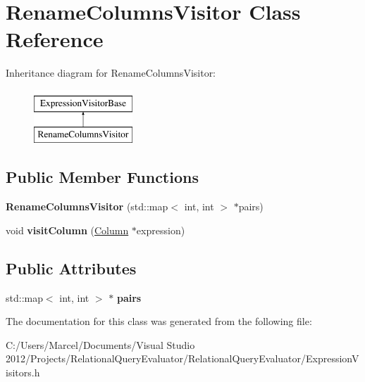 \hypertarget{class_rename_columns_visitor}{\section{Rename\+Columns\+Visitor Class Reference}
\label{class_rename_columns_visitor}
}
Inheritance diagram for Rename\+Columns\+Visitor\+:\begin{figure}[H]
\begin{center}
\leavevmode
\includegraphics[height=2.000000cm]{class_rename_columns_visitor}
\end{center}
\end{figure}
\subsection*{Public Member Functions}
\begin{DoxyCompactItemize}
\item 
\hypertarget{class_rename_columns_visitor_a119cb79b414164ac4bb2adcfaf6bdcf9}{{\bfseries Rename\+Columns\+Visitor} (std\+::map$<$ int, int $>$ $\ast$pairs)}\label{class_rename_columns_visitor_a119cb79b414164ac4bb2adcfaf6bdcf9}

\item 
\hypertarget{class_rename_columns_visitor_a45835dde3fa3190a803493a0e3f1e75a}{void {\bfseries visit\+Column} (\hyperlink{class_column}{Column} $\ast$expression)}\label{class_rename_columns_visitor_a45835dde3fa3190a803493a0e3f1e75a}

\end{DoxyCompactItemize}
\subsection*{Public Attributes}
\begin{DoxyCompactItemize}
\item 
\hypertarget{class_rename_columns_visitor_a40542b4f59af34a28e298d719ca426c1}{std\+::map$<$ int, int $>$ $\ast$ {\bfseries pairs}}\label{class_rename_columns_visitor_a40542b4f59af34a28e298d719ca426c1}

\end{DoxyCompactItemize}


The documentation for this class was generated from the following file\+:\begin{DoxyCompactItemize}
\item 
C\+:/\+Users/\+Marcel/\+Documents/\+Visual Studio 2012/\+Projects/\+Relational\+Query\+Evaluator/\+Relational\+Query\+Evaluator/Expression\+Visitors.\+h\end{DoxyCompactItemize}
